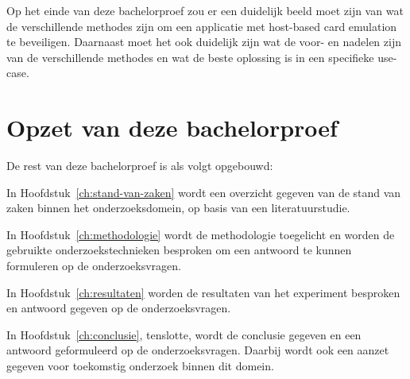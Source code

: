 Op het einde van deze bachelorproef zou er een duidelijk beeld moet zijn van wat de verschillende methodes zijn om een applicatie met host-based card emulation te beveiligen. Daarnaast moet het ook duidelijk zijn wat de voor- en nadelen zijn van de verschillende methodes en wat de beste oplossing is in een specifieke use-case.

\section{Opzet van deze bachelorproef}
\label{sec:opzet-bachelorproef}


De rest van deze bachelorproef is als volgt opgebouwd:

In Hoofdstuk~\ref{ch:stand-van-zaken} wordt een overzicht gegeven van de stand van zaken binnen het onderzoeksdomein, op basis van een literatuurstudie.

In Hoofdstuk~\ref{ch:methodologie} wordt de methodologie toegelicht en worden de gebruikte onderzoekstechnieken besproken om een antwoord te kunnen formuleren op de onderzoeksvragen.


In Hoofdstuk~\ref{ch:resultaten} worden de resultaten van het experiment besproken en antwoord gegeven op de onderzoeksvragen.

In Hoofdstuk~\ref{ch:conclusie}, tenslotte, wordt de conclusie gegeven en een antwoord geformuleerd op de onderzoeksvragen. Daarbij wordt ook een aanzet gegeven voor toekomstig onderzoek binnen dit domein.

